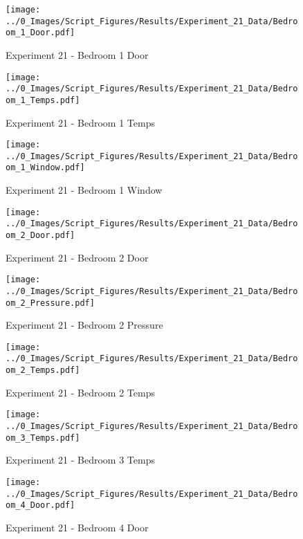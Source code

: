 	\begin{figure}[H]
		\centering
		\texttt{[image: ../0\_Images/Script\_Figures/Results/Experiment\_21\_Data/Bedroom\_1\_Door.pdf]}
		\caption[]{Experiment 21 - Bedroom 1 Door}
	\end{figure}
 

	\begin{figure}[H]
		\centering
		\texttt{[image: ../0\_Images/Script\_Figures/Results/Experiment\_21\_Data/Bedroom\_1\_Temps.pdf]}
		\caption[]{Experiment 21 - Bedroom 1 Temps}
	\end{figure}
 
	\clearpage

	\begin{figure}[H]
		\centering
		\texttt{[image: ../0\_Images/Script\_Figures/Results/Experiment\_21\_Data/Bedroom\_1\_Window.pdf]}
		\caption[]{Experiment 21 - Bedroom 1 Window}
	\end{figure}
 

	\begin{figure}[H]
		\centering
		\texttt{[image: ../0\_Images/Script\_Figures/Results/Experiment\_21\_Data/Bedroom\_2\_Door.pdf]}
		\caption[]{Experiment 21 - Bedroom 2 Door}
	\end{figure}
 
	\clearpage

	\begin{figure}[H]
		\centering
		\texttt{[image: ../0\_Images/Script\_Figures/Results/Experiment\_21\_Data/Bedroom\_2\_Pressure.pdf]}
		\caption[]{Experiment 21 - Bedroom 2 Pressure}
	\end{figure}
 

	\begin{figure}[H]
		\centering
		\texttt{[image: ../0\_Images/Script\_Figures/Results/Experiment\_21\_Data/Bedroom\_2\_Temps.pdf]}
		\caption[]{Experiment 21 - Bedroom 2 Temps}
	\end{figure}
 
	\clearpage

	\begin{figure}[H]
		\centering
		\texttt{[image: ../0\_Images/Script\_Figures/Results/Experiment\_21\_Data/Bedroom\_3\_Temps.pdf]}
		\caption[]{Experiment 21 - Bedroom 3 Temps}
	\end{figure}
 

	\begin{figure}[H]
		\centering
		\texttt{[image: ../0\_Images/Script\_Figures/Results/Experiment\_21\_Data/Bedroom\_4\_Door.pdf]}
		\caption[]{Experiment 21 - Bedroom 4 Door}
	\end{figure}
 
